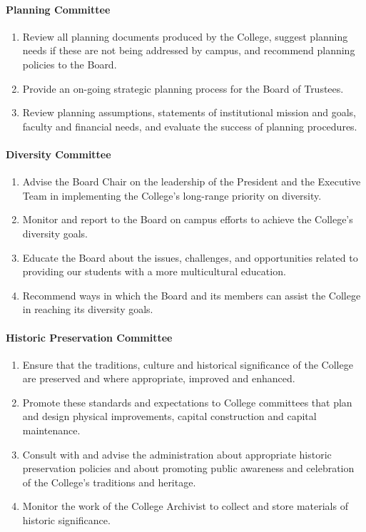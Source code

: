 			\paragraph{Planning Committee}
				\begin{enumerate}
					\item{Review all planning documents produced by the College, suggest planning needs if these are not being addressed by campus, and recommend planning policies to the Board.}
					\item{Provide an on-going strategic planning process for the Board of Trustees.}
					\item{Review planning assumptions, statements of institutional mission and goals, faculty and financial needs, and evaluate the success of planning procedures.}
				\end{enumerate}
			\paragraph{Diversity Committee}
				\begin{enumerate}
					\item{Advise the Board Chair on the leadership of the President and the Executive Team in implementing the College's long-range priority on diversity.}
					\item{Monitor and report to the Board on campus efforts to achieve the College's diversity goals.}
					\item{Educate the Board about the issues, challenges, and opportunities related to providing our students with a more multicultural education.}
					\item{Recommend ways in which the Board and its members can assist the College in reaching its diversity goals.}
				\end{enumerate}
			\paragraph{Historic Preservation Committee}
				\begin{enumerate}
					\item{Ensure that the traditions, culture and historical significance of the College are preserved and where appropriate, improved and enhanced.}
					\item{Promote these standards and expectations to College committees that plan and design physical improvements, capital construction and capital maintenance.}
					\item{Consult with and advise the administration about appropriate historic preservation policies and about promoting public awareness and celebration of the College's traditions and heritage.}
					\item{Monitor the work of the College Archivist to collect and store materials of historic significance.}
				\end{enumerate}
